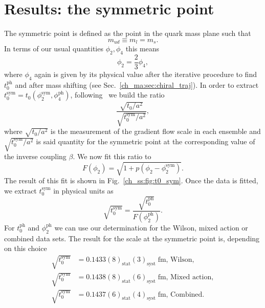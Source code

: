 {\section{Results: the symmetric point}

The symmetric point is defined as the point in the quark mass plane such that
\begin{equation}
m_{ud}\equiv m_l=m_s.
\end{equation}
In terms of our usual quantities $\phi_2,\phi_4$ this means
\begin{equation}
\phi_2=\frac{2}{3}\phi_4,
\end{equation}
where $\phi_4$ again is given by its physical value after the iterative procedure to find $t_0^{\textrm{ph}}$ and after mass shifting (see Sec.~\ref{ch_ma:sec:chiral_traj}). In order to extract $t_0^{\textrm{sym}}=t_0(\phi_2^{\textrm{sym}},\phi_4^{\textrm{ph}})$, following~\citep{Strassberger:2023xnj} we build the ratio
\begin{equation}
\frac{\sqrt{t_0/a^2}}{\sqrt{t_0^{\textrm{sym}}/a^2}},
\end{equation}
where $\sqrt{t_0/a^2}$ is the measurement of the gradient flow scale in each ensemble and $\sqrt{t_0^{\textrm{sym}}/a^2}$ is said quantity for the symmetric point at the corresponding value of the inverse coupling $\beta$. We now fit this ratio to
\begin{equation}
\label{ch_ss:eq:fit_t0_sym}
F(\phi_2)=\sqrt{1+p(\phi_2-\phi_2^{\textrm{sym}})}.
\end{equation}
The result of this fit is shown in Fig.~\ref{ch_ss:fig:t0_sym}. Once the data is fitted, we extract $t_0^{\textrm{sym}}$ in physical units as
\begin{equation}
\sqrt{t_0^{\textrm{sym}}}=\frac{\sqrt{t_0^{\textrm{ph}}}}{F(\phi_2^{\textrm{ph}})}.
\end{equation}
For $t_0^{\textrm{ph}}$ and $\phi_2^{\textrm{ph}}$ we can use our determination for the Wilson, mixed action or combined data sets. The result for the scale at the symmetric point is, depending on this choice
\begin{align}
\label{ch_ss:eq:t0_sym}
\sqrt{t_0^{\textrm{sym}}}&=0.1433(8)_{\textrm{stat}}(3)_{\textrm{syst}}\;\textrm{fm, Wilson}, \\
\sqrt{t_0^{\textrm{sym}}}&=0.1438(8)_{\textrm{stat}}(6)_{\textrm{syst}}\;\textrm{fm, Mixed action}, \\
\sqrt{t_0^{\textrm{sym}}}&=0.1437(6)_{\textrm{stat}}(4)_{\textrm{syst}}\;\textrm{fm, Combined}.
\end{align}

}
